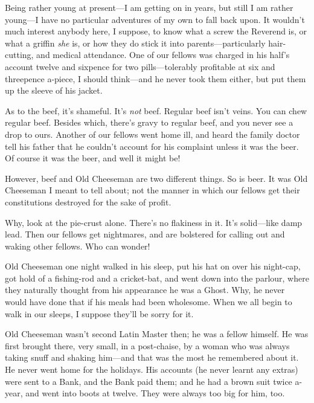 Being rather young at present---I am getting on in years, but still I
am rather young---I have no particular adventures of my own to fall
back upon.  It wouldn't much interest anybody here, I suppose, to
know what a screw the Reverend is, or what a griffin \emph{she} is, or how
they do stick it into parents---particularly hair-cutting, and
medical attendance.  One of our fellows was charged in his half's
account twelve and sixpence for two pills---tolerably profitable at
six and threepence a-piece, I should think---and he never took them
either, but put them up the sleeve of his jacket.

As to the beef, it's shameful.  It's \emph{not} beef.  Regular beef isn't
veins.  You can chew regular beef.  Besides which, there's gravy to
regular beef, and you never see a drop to ours.  Another of our
fellows went home ill, and heard the family doctor tell his father
that he couldn't account for his complaint unless it was the beer.
Of course it was the beer, and well it might be!

However, beef and Old Cheeseman are two different things.  So is
beer.  It was Old Cheeseman I meant to tell about; not the manner in
which our fellows get their constitutions destroyed for the sake of
profit.

Why, look at the pie-crust alone.  There's no flakiness in it.  It's
solid---like damp lead.  Then our fellows get nightmares, and are
bolstered for calling out and waking other fellows.  Who can wonder!

Old Cheeseman one night walked in his sleep, put his hat on over his
night-cap, got hold of a fishing-rod and a cricket-bat, and went
down into the parlour, where they naturally thought from his
appearance he was a Ghost.  Why, he never would have done that if
his meals had been wholesome.  When we all begin to walk in our
sleeps, I suppose they'll be sorry for it.

Old Cheeseman wasn't second Latin Master then; he was a fellow
himself.  He was first brought there, very small, in a post-chaise,
by a woman who was always taking snuff and shaking him---and that was
the most he remembered about it.  He never went home for the
holidays.  His accounts (he never learnt any extras) were sent to a
Bank, and the Bank paid them; and he had a brown suit twice a-year,
and went into boots at twelve.  They were always too big for him,
too.

